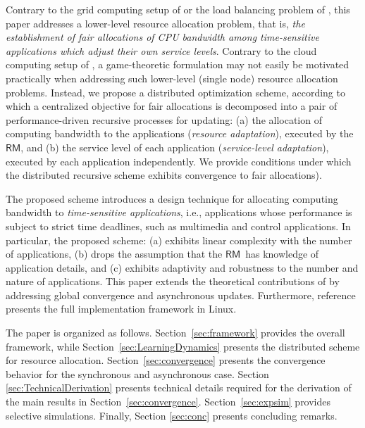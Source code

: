 \documentclass[letter,11pt]{article}
\begin{document}
Contrary to the grid computing setup of \cite{Sub08} or the load balancing problem of \cite{Gro05,Wei10}, this paper addresses a lower-level resource allocation problem, that is, \emph{the establishment of fair allocations of CPU bandwidth among time-sensitive applications which adjust their own service levels}. Contrary to the cloud computing setup of \cite{Wei10}, a game-theoretic formulation may not easily be motivated practically when addressing such lower-level (single node) resource allocation problems. Instead, we propose a distributed optimization scheme, according to which a centralized objective for fair allocations is decomposed into a pair of performance-driven recursive processes for updating: (a) the allocation of computing bandwidth to the applications (\emph{resource adaptation}), executed by the {$\mathsf{RM}$}, and (b) the service level of each application (\emph{service-level adaptation}), executed by each application independently. We provide conditions under which the distributed recursive scheme exhibits convergence to fair allocations). 

The proposed scheme introduces a design technique for allocating computing bandwidth to \textit{time-sensitive applications}, i.e., applications whose performance is subject to strict time deadlines, such as multimedia and control applications. In particular, the proposed scheme: (a) exhibits linear complexity with the number of applications, (b) drops the assumption that the {$\mathsf{RM}$}\ has knowledge of application details, and (c) exhibits adaptivity and robustness to the number and nature of applications. This paper extends the theoretical contributions of \cite{Cha13} by addressing global convergence and asynchronous updates. 
Furthermore, reference~\cite{MagECRTS} presents the full implementation framework in Linux. 

The paper is organized as follows. Section~\ref{sec:framework}
provides the overall framework, while Section~\ref{sec:LearningDynamics} presents the distributed scheme for resource allocation. Section~\ref{sec:convergence} presents the convergence behavior for the synchronous and asynchronous case. Section
\ref{sec:TechnicalDerivation} presents technical details required for
the derivation of the main results in Section~\ref{sec:convergence}. Section~\ref{sec:expsim} provides selective simulations. Finally, Section \ref{sec:conc}
presents concluding remarks.
\end{document}
